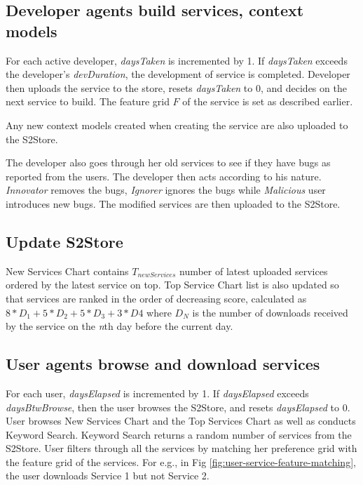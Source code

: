 \subsection{Developer agents build services, context models}

For each active developer, \emph{daysTaken} is incremented by 1. If \emph{daysTaken} exceeds the developer's \emph{devDuration}, the development of service is completed. Developer then uploads the service to the store, resets \emph{daysTaken} to 0, and decides on the next service to build. The feature grid $F$ of the service is set as described earlier.

Any new context models created when creating the service are also uploaded to the S2Store.

The developer also goes through her old services to see if they have bugs as reported from the users. The developer then acts according to his nature. \emph{Innovator} removes the bugs, \emph{Ignorer} ignores the bugs while \emph{Malicious} user introduces new bugs. The modified services are then uploaded to the S2Store.

\subsection{Update S2Store}

New Services Chart contains $T_{newServices}$ number of latest uploaded services ordered by the latest service on top. Top Service Chart list is also updated so that services are ranked in the order of decreasing score, calculated as $8*D_1+5*D_2+5*D_3+3*D4$ where $D_N$ is the number of downloads received by the service on the \emph{n}th day before the current day.

\subsection{User agents browse and download services}
For each user, \emph{daysElapsed} is incremented by 1. If \emph{daysElapsed} exceeds \emph{daysBtwBrowse}, then the user browses the S2Store, and resets \emph{daysElapsed} to 0. User browses New Services Chart and the Top Services Chart as well as conducts Keyword Search. Keyword Search returns a random number of services from the S2Store. User filters through all the services by matching her preference grid with the feature grid of the services. For e.g., in Fig \ref{fig:user-service-feature-matching}, the user downloads Service 1 but not Service 2.

